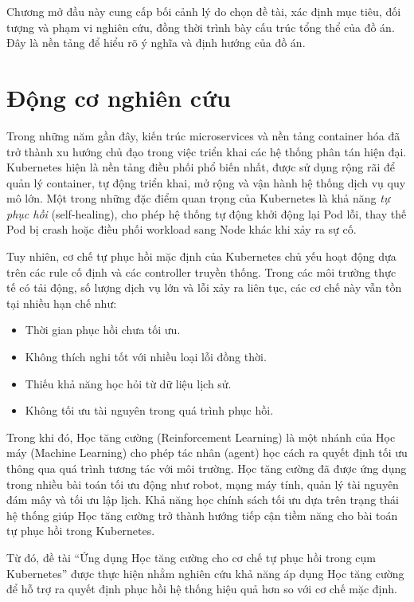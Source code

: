 Chương mở đầu này cung cấp bối cảnh lý do chọn đề tài, 
xác định mục tiêu, đối tượng và phạm vi nghiên cứu, đồng thời 
trình bày cấu trúc tổng thể của đồ án. 
Đây là nền tảng để hiểu rõ ý nghĩa và định hướng của đồ án.
\section{Động cơ nghiên cứu}

Trong những năm gần đây, kiến trúc microservices và nền tảng container hóa đã trở thành xu hướng 
chủ đạo trong việc triển khai các hệ thống phân tán hiện đại. Kubernetes hiện là nền tảng 
điều phối phổ biến nhất, được sử dụng rộng rãi để quản lý container, tự động triển khai, mở rộng 
và vận hành hệ thống dịch vụ quy mô lớn. Một trong những đặc điểm quan trọng của Kubernetes là 
khả năng \textit{tự phục hồi} (self-healing), cho phép hệ thống tự động khởi động lại Pod lỗi, thay thế Pod bị crash hoặc điều phối workload sang Node khác khi xảy ra sự cố.

Tuy nhiên, cơ chế tự phục hồi mặc định của Kubernetes chủ yếu hoạt động dựa trên các rule cố định và các controller truyền thống. Trong các môi trường thực tế có tải động, số lượng dịch vụ lớn và lỗi xảy ra liên tục, các cơ chế này vẫn tồn tại nhiều hạn chế như:
\begin{itemize}
    \item Thời gian phục hồi chưa tối ưu.
    \item Không thích nghi tốt với nhiều loại lỗi đồng thời.
    \item Thiếu khả năng học hỏi từ dữ liệu lịch sử.
    \item Không tối ưu tài nguyên trong quá trình phục hồi.
\end{itemize}

Trong khi đó, Học tăng cường (Reinforcement Learning) là một nhánh của Học máy (Machine Learning) 
cho phép tác nhân (agent) học cách ra quyết định tối ưu thông qua quá trình tương tác với môi trường. 
Học tăng cường đã được ứng dụng trong nhiều bài toán tối ưu động như robot, mạng máy tính, quản lý 
tài nguyên đám mây và tối ưu lập lịch. Khả năng học chính sách tối ưu dựa trên trạng thái hệ thống 
giúp Học tăng cường trở thành hướng tiếp cận tiềm năng cho bài toán tự phục hồi trong Kubernetes.

Từ đó, đề tài “Ứng dụng Học tăng cường cho cơ chế tự phục hồi trong cụm Kubernetes” được thực hiện 
nhằm nghiên cứu khả năng áp dụng Học tăng cường để hỗ trợ ra quyết định phục hồi hệ thống hiệu quả 
hơn so với cơ chế mặc định.

